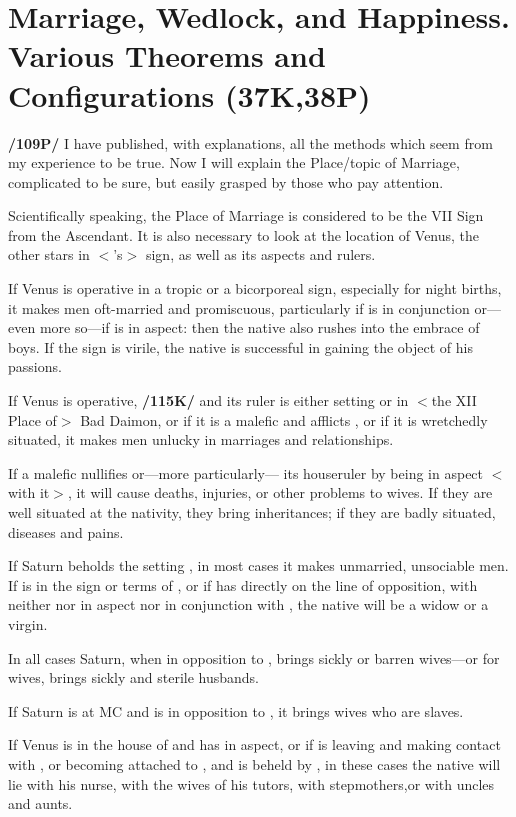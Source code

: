 \section{Marriage, Wedlock, and Happiness. Various Theorems and Configurations (37K,38P)}

\textbf{/109P/} I have published, with explanations, all the methods which seem from my experience to be true. Now
I will explain the Place/topic of Marriage, complicated to be sure, but easily grasped by those who pay attention.

Scientifically speaking, the Place of Marriage is considered to be the VII Sign from the Ascendant. It is also necessary to look at the location of Venus, the other stars in $<$\Venus’s$>$ sign, as well as its aspects and rulers. 

If Venus is operative in a tropic or a bicorporeal sign, especially for night births, it makes men oft-married and promiscuous, particularly if \Mercury\xspace is in conjunction or—even more so—if \Mars\xspace is in aspect: then the native also rushes into the embrace of boys. If the sign is virile, the native is successful in gaining the object of his passions. 

If Venus is operative, \textbf{/115K/} and its ruler is either setting or in $<$the XII Place of$>$ Bad Daimon, or if it is a malefic and afflicts \Venus, or if it is wretchedly situated, it makes men unlucky in marriages and relationships. 

If a malefic nullifies \Venus\xspace or—more particularly—
its houseruler by being in aspect $<$with it$>$, it will cause deaths, injuries, or other problems to wives. If they are well situated at the nativity, they bring inheritances; if they are badly situated, diseases and pains.

If Saturn beholds the setting \Venus, in most cases it makes unmarried, unsociable men. If \Venus\xspace is in the sign or terms of \Saturn, or if \Venus\xspace has \Saturn\xspace directly on the line of opposition, with neither \Mars\xspace nor \Jupiter\xspace in aspect nor \Mercury\xspace in conjunction with \Venus, the native will be a widow or a virgin. 

In all cases Saturn, when in opposition to \Venus, brings sickly or barren wives—or for wives, brings sickly and
sterile husbands. 

If Saturn is at MC and is in opposition to \Venus, it brings wives who are slaves. 

If Venus is in the house of \Saturn\xspace and has
 \Jupiter\xspace in aspect, or if \Venus\xspace is leaving \Jupiter\xspace and making contact with \Saturn, or becoming attached to \Saturn, and is beheld by \Mars, in these cases the native will lie with his nurse, with the wives of his tutors, with stepmothers,or with uncles and aunts. 

